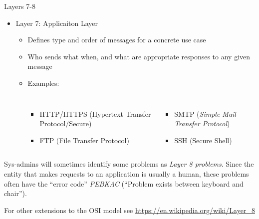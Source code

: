 \begin{frame}[fragile]{Layers 7-8}
%
\begin{itemize}
\item Layer 7: Applicaiton Layer
	\begin{itemize}
	\item Defines type and order of messages for a concrete use case
	\item[\Thus] Who sends what when, and what are appropriate responses to any given message
	\item Examples: 
		\begin{columns}
			\begin{itemize}
			\item HTTP/HTTPS (Hypertext Transfer Protocol/Secure)
			\item FTP (File Transfer Protocol)
			\end{itemize}
			\begin{itemize}
			\item SMTP (\emph{Simple Mail Transfer Protocol})
			\item SSH (Secure Shell)
			\end{itemize}
		\end{columns}
	\end{itemize}
\end{itemize}
\pause
%
\begin{hintbox}
\footnotesize
Sys-admins will sometimes identify some problems as \emph{Layer 8 problems}. Since the entity that makes requests to an application is usually a human, these problems often have the \enquote{error code} \emph{PEBKAC} (\enquote{Problem exists between keyboard and chair}).

For other extensions to the OSI model see \url{https://en.wikipedia.org/wiki/Layer_8}
\end{hintbox}
%
\end{frame}


